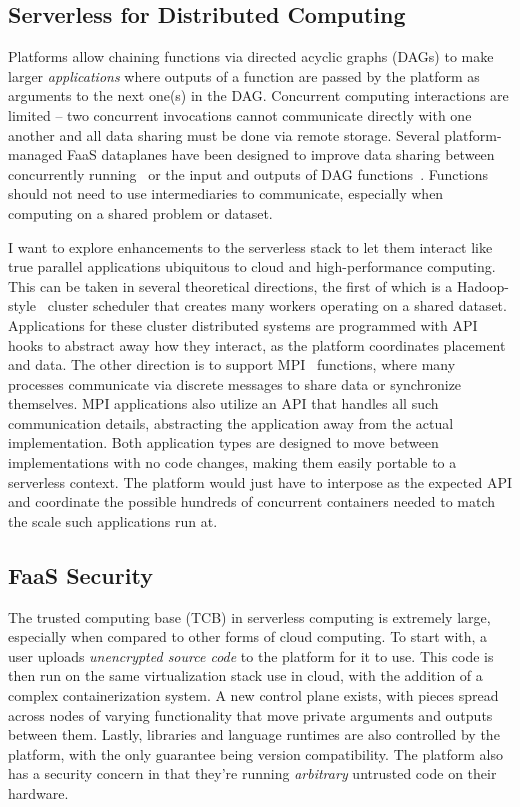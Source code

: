 \subsection{Serverless for Distributed Computing}
\label{sec:new-mpi}

Platforms allow chaining functions via directed acyclic graphs (DAGs) to make larger \emph{applications} where outputs of a function are passed by the platform as arguments to the next one(s) in the DAG.
Concurrent computing interactions are limited -- two concurrent invocations cannot communicate directly with one another and all data sharing must be done via remote storage.
Several platform-managed FaaS dataplanes have been designed to improve data sharing between concurrently running~\cite{giantsidi2023flexlog,sreekanti2020fault} or the input and outputs of DAG functions~\cite{mvondo2021ofc,romero2021faa,abdi2023palette}.
Functions should not need to use intermediaries to communicate, especially when computing on a shared problem or dataset.

I want to explore enhancements to the serverless stack to let them interact like true parallel applications ubiquitous to cloud and high-performance computing.
This can be taken in several theoretical directions, the first of which is a Hadoop-style~\cite{hadoop} cluster scheduler that creates many workers operating on a shared dataset.
Applications for these cluster distributed systems are programmed with API hooks to abstract away how they interact, as the platform coordinates placement and data.
The other direction is to support MPI~\cite{mpi} functions, where many processes communicate via discrete messages to share data or synchronize themselves.
MPI applications also utilize an API that handles all such communication details, abstracting the application away from the actual implementation.
Both application types are designed to move between implementations with no code changes, making them easily portable to a serverless context.
The platform would just have to interpose as the expected API and coordinate the possible hundreds of concurrent containers needed to match the scale such applications run at.

\subsection{FaaS Security}

The trusted computing base (TCB) in serverless computing is extremely large, especially when compared to other forms of cloud computing.
To start with, a user uploads \emph{unencrypted source code} to the platform for it to use.
This code is then run on the same virtualization stack use in cloud, with the addition of a complex containerization system.
A new control plane exists, with pieces spread across nodes of varying functionality that move private arguments and outputs between them.
Lastly, libraries and language runtimes are also controlled by the platform, with the only guarantee being version compatibility. 
The platform also has a security concern in that they're running \emph{arbitrary} untrusted code on their hardware.

